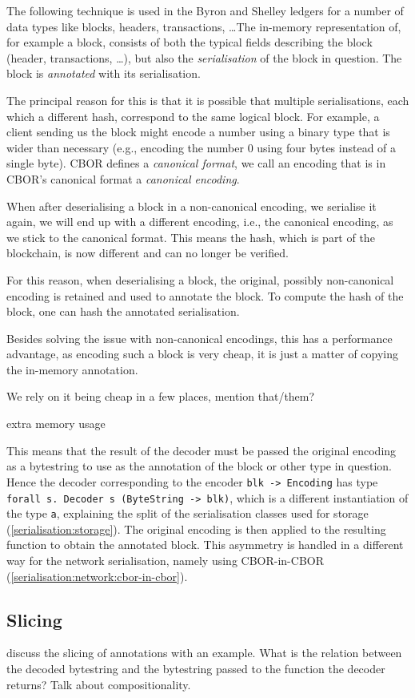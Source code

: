 The following technique is used in the Byron and Shelley ledgers for a number of
data types like blocks, headers, transactions, \ldots The in-memory representation
of, for example a block, consists of both the typical fields describing the
block (header, transactions, \ldots), but also the \emph{serialisation} of the block
in question. The block is \emph{annotated} with its serialisation.

The principal reason for this is that it is possible that multiple
serialisations, each which a different hash, correspond to the same logical
block. For example, a client sending us the block might encode a number using a
binary type that is wider than necessary (e.g., encoding the number 0 using four
bytes instead of a single byte). CBOR defines a \emph{canonical format}, we call
an encoding that is in CBOR's canonical format a \emph{canonical
encoding}.

When after deserialising a block in a non-canonical encoding, we serialise it
again, we will end up with a different encoding, i.e., the canonical encoding,
as we stick to the canonical format. This means the hash, which is part of the
blockchain, is now different and can no longer be verified.

For this reason, when deserialising a block, the original, possibly
non-canonical encoding is retained and used to annotate the block. To compute
the hash of the block, one can hash the annotated serialisation.

Besides solving the issue with non-canonical encodings, this has a performance
advantage, as encoding such a block is very cheap, it is just a matter of
copying the in-memory annotation.

 We rely on it being cheap in a few places, mention that/them?

 extra memory usage

This means that the result of the decoder must be passed the original encoding
as a bytestring to use as the annotation of the block or other type in question.
Hence the decoder corresponding to the encoder \lstinline!blk -> Encoding! has
type \lstinline!forall s. Decoder s (ByteString -> blk)!, which is a different
instantiation of the type \lstinline!a!, explaining the split of the
serialisation classes used for storage (\cref{serialisation:storage}). The
original encoding is then applied to the resulting function to obtain the
annotated block. This asymmetry is handled in a different way for the network
serialisation, namely using CBOR-in-CBOR
(\cref{serialisation:network:cbor-in-cbor}).

\subsection{Slicing}

 discuss the slicing of annotations with an example. What is the
relation between the decoded bytestring and the bytestring passed to the
function the decoder returns? Talk about compositionality.
